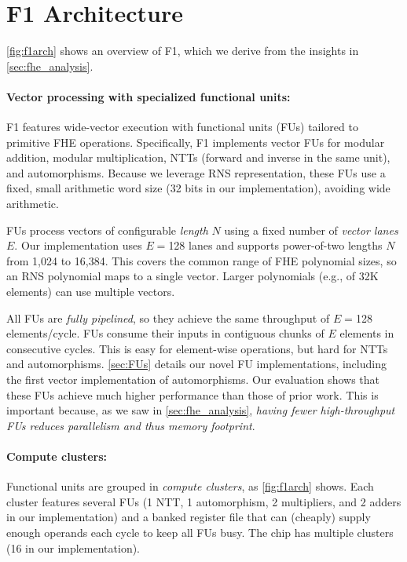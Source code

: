 \section{F1 Architecture}\label{sec:arch}

\autoref{fig:f1arch} shows an overview of F1, which we derive from the insights in \autoref{sec:fhe_analysis}.

\paragraph{Vector processing with specialized functional units:}
F1 features wide-vector execution with functional units (FUs) tailored to
primitive FHE operations. Specifically, F1 implements vector FUs for modular
addition, modular multiplication, NTTs (forward and inverse in the same unit),
and automorphisms. Because we leverage RNS representation, these FUs use a
fixed, small arithmetic word size (32 bits in our implementation), avoiding
wide arithmetic.

FUs process vectors of configurable \emph{length} $N$ using a fixed number of
\emph{vector lanes} $E$. Our implementation uses $E=$128 lanes and supports
power-of-two lengths $N$ from 1,024 to 16,384. This covers the common range of
FHE polynomial sizes, so an RNS polynomial maps to a single vector. Larger
polynomials (e.g., of 32K elements) can use multiple vectors.

All FUs are \emph{fully pipelined}, so they achieve the same throughput of
$E=$128 elements/cycle. FUs consume their inputs in contiguous chunks of $E$
elements in consecutive cycles. This is easy for element-wise operations, but
hard for NTTs and automorphisms. \autoref{sec:FUs} details our novel FU
implementations, including the first vector implementation of automorphisms.
Our evaluation shows that these FUs achieve much higher performance than those
of prior work. This is important because, as we saw in
\autoref{sec:fhe_analysis}, \emph{having fewer high-throughput FUs reduces
parallelism and thus memory footprint}.

\paragraph{Compute clusters:}
Functional units are grouped in \emph{compute clusters}, as
\autoref{fig:f1arch} shows. Each cluster features several FUs (1 NTT, 1
automorphism, 2 multipliers, and 2 adders in our implementation) and a banked
register file that can (cheaply) supply enough operands each cycle to keep all
FUs busy. The chip has multiple clusters (16 in our implementation).

